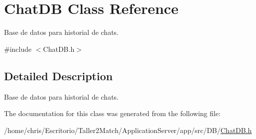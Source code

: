 \hypertarget{class_chat_d_b}{}\section{Chat\+D\+B Class Reference}
\label{class_chat_d_b}


Base de datos para historial de chats.  




{\ttfamily \#include $<$Chat\+D\+B.\+h$>$}



\subsection{Detailed Description}
Base de datos para historial de chats. 

The documentation for this class was generated from the following file\+:\begin{DoxyCompactItemize}
\item 
/home/chris/\+Escritorio/\+Taller2\+Match/\+Application\+Server/app/src/\+D\+B/\hyperlink{_chat_d_b_8h}{Chat\+D\+B.\+h}\end{DoxyCompactItemize}
